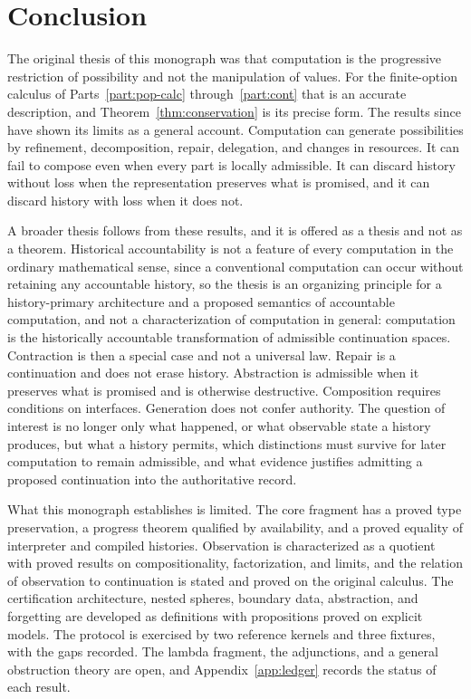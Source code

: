 \documentclass[12pt,oneside,openany]{book}
\theoremstyle{spherepop}
\theoremstyle{remarkstyle}
\begin{document}
\chapter{Conclusion}
\label{ch:conclusion}

The original thesis of this monograph was that computation is the progressive restriction of possibility and not the manipulation of values. For the finite-option calculus of Parts~\ref{part:pop-calc} through~\ref{part:cont} that is an accurate description, and Theorem~\ref{thm:conservation} is its precise form. The results since have shown its limits as a general account. Computation can generate possibilities by refinement, decomposition, repair, delegation, and changes in resources. It can fail to compose even when every part is locally admissible. It can discard history without loss when the representation preserves what is promised, and it can discard history with loss when it does not.

A broader thesis follows from these results, and it is offered as a thesis and not as a theorem. Historical accountability is not a feature of every computation in the ordinary mathematical sense, since a conventional computation can occur without retaining any accountable history, so the thesis is an organizing principle for a history-primary architecture and a proposed semantics of accountable computation, and not a characterization of computation in general: computation is the historically accountable transformation of admissible continuation spaces. Contraction is then a special case and not a universal law. Repair is a continuation and does not erase history. Abstraction is admissible when it preserves what is promised and is otherwise destructive. Composition requires conditions on interfaces. Generation does not confer authority. The question of interest is no longer only what happened, or what observable state a history produces, but what a history permits, which distinctions must survive for later computation to remain admissible, and what evidence justifies admitting a proposed continuation into the authoritative record.

What this monograph establishes is limited. The core fragment has a proved type preservation, a progress theorem qualified by availability, and a proved equality of interpreter and compiled histories. Observation is characterized as a quotient with proved results on compositionality, factorization, and limits, and the relation of observation to continuation is stated and proved on the original calculus. The certification architecture, nested spheres, boundary data, abstraction, and forgetting are developed as definitions with propositions proved on explicit models. The protocol is exercised by two reference kernels and three fixtures, with the gaps recorded. The lambda fragment, the adjunctions, and a general obstruction theory are open, and Appendix~\ref{app:ledger} records the status of each result.
\end{document}
